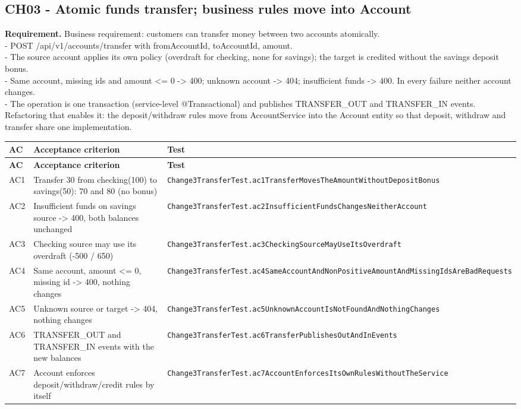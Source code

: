 \documentclass[11pt,a4paper]{article}
\begin{document}
\subsection{CH03 - Atomic funds transfer; business rules move into Account}
\textbf{Requirement.} Business requirement: customers can transfer money between two accounts atomically.\\ - POST /api/v1/accounts/transfer with fromAccountId, toAccountId, amount.\\ - The source account applies its own policy (overdraft for checking, none for savings); the target is credited without the savings deposit bonus.\\ - Same account, missing ids and amount \textless{}= 0 -\textgreater{} 400; unknown account -\textgreater{} 404; insufficient funds -\textgreater{} 400. In every failure neither account changes.\\ - The operation is one transaction (service-level @Transactional) and publishes TRANSFER\_OUT and TRANSFER\_IN events.\\ Refactoring that enables it: the deposit/withdraw rules move from AccountService into the Account entity so that deposit, withdraw and transfer share one implementation.
{\footnotesize
\begin{longtable}{@{}p{1cm}p{7.6cm}p{7cm}@{}}
\toprule \textbf{AC} & \textbf{Acceptance criterion} & \textbf{Test} \\ \midrule \endfirsthead
\toprule \textbf{AC} & \textbf{Acceptance criterion} & \textbf{Test} \\ \midrule \endhead
\bottomrule \endfoot
AC1 & Transfer 30 from checking(100) to savings(50): 70 and 80 (no bonus) & \texttt{Change3TransferTest.\allowbreak{}ac1TransferMovesTheAmountWithoutDepositBonus} \\
AC2 & Insufficient funds on savings source -\textgreater{} 400, both balances unchanged & \texttt{Change3TransferTest.\allowbreak{}ac2InsufficientFundsChangesNeitherAccount} \\
AC3 & Checking source may use its overdraft (-500 / 650) & \texttt{Change3TransferTest.\allowbreak{}ac3CheckingSourceMayUseItsOverdraft} \\
AC4 & Same account, amount \textless{}= 0, missing id -\textgreater{} 400, nothing changes & \texttt{Change3TransferTest.\allowbreak{}ac4SameAccountAndNonPositiveAmountAndMissingIdsAreBadRequests} \\
AC5 & Unknown source or target -\textgreater{} 404, nothing changes & \texttt{Change3TransferTest.\allowbreak{}ac5UnknownAccountIsNotFoundAndNothingChanges} \\
AC6 & TRANSFER\_OUT and TRANSFER\_IN events with the new balances & \texttt{Change3TransferTest.\allowbreak{}ac6TransferPublishesOutAndInEvents} \\
AC7 & Account enforces deposit/withdraw/credit rules by itself & \texttt{Change3TransferTest.\allowbreak{}ac7AccountEnforcesItsOwnRulesWithoutTheService} \\
\end{longtable}
}
\end{document}
